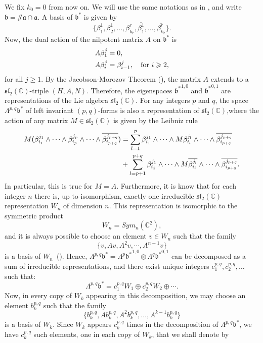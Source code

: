 \documentclass[leqno]{article}
\theoremstyle{definition}
\numberwithin{equation}{section}
\begin{document}
We fix $k_0 = 0$ from now on. We will use the same notations as in \cite{AABRW}, and write $\mathfrak{b} = \mathcal{J}\mathfrak{a} \cap \mathfrak{a}$. A basis of $\mathfrak{b}^*$ is given by
\[
\{
\beta_1^1, \beta_2^1, \dots, \beta_{k_r}^r, \overline{\beta_1^1}, \dots, \overline{\beta_{k_r}^r}
\}.
\]
Now, the dual action of the nilpotent matrix $A$ on $\mathfrak{b}^*$ is 
\[
\aligned
A\beta_1^j &= 0, \\
A\beta_i^j &= \beta_{i-1}^j, \quad \text{for} \ i \geqslant 2,
\endaligned
\]
for all $j \geqslant 1$.
By the Jacobson-Morozov Theorem (\cite{Knapp}), the matrix $A$ extends to a $\mathfrak{sl}_2(\mathbb{C})$-triple $(H, A, N)$. Therefore, the eigenspaces ${\mathfrak{b}^*}^{1, 0}$ and ${\mathfrak{b}^*}^{0, 1}$ are representations of the Lie algebra $\mathfrak{sl}_2(\mathbb{C})$. For any integers $p$ and $q$, the space $\Lambda^{p, q} \mathfrak{b}^*$ of left invariant $(p, q)$-forms is also a representation of $\mathfrak{sl}_2(\mathbb{C})$,where the action of any matrix $M \in \mathfrak{sl}_2(\mathbb{C})$ is given by the Leibniz rule
\[
\aligned
M(\beta_{i_1}^{j_1} \wedge \cdots \wedge \beta_{i_p}^{j_p} \wedge \cdots \wedge \overline{\beta_{i_{p+q}}^{j_{p+q}}})
&=
\sum_{l=1}^{p} \beta_{i_1}^{j_1} \wedge \cdots \wedge M\beta_{i_l}^{j_l} \wedge \cdots \wedge \overline{\beta_{i_{p+q}}^{j_{p+q}}} \\
&+
\sum_{l=p+1}^{p+q} \beta_{i_1}^{j_1} \wedge \cdots \wedge M\overline{\beta_{i_l}^{j_l}} \wedge \cdots \wedge \overline{\beta_{i_{p+q}}^{j_{p+q}}}.
\endaligned
\]
In particular, this is true for $M = A$.
Furthermore, it is know that for each integer $n$ there is, up to isomorphism, exactly one irreducible $\mathfrak{sl}_2(\mathbb{C})$ representation $W_n$ of dimension $n$. This representation is isomorphic to the symmetric product
\[
W_n
=
Sym_n(\mathbb{C}^2),
\] 
and it is always possible to choose an element $v \in W_n$ such that the family
\[
\{
v, Av, A^2v, \cdots, A^{n-1}v
\}
\]
is a basis of $W_n$~(\cite{FH}).
Hence, $\Lambda^{p, q}\mathfrak{b}^* = \Lambda^p {\mathfrak{b}^*}^{1, 0} \otimes \Lambda^q {\mathfrak{b}^*}^{0, 1}$ can be decomposed as a sum of irreducible representations, and there exist unique integers $c_1^{p, q}, c_2^{p, q}, \dots$ such that:
\[
\Lambda^{p, q}\mathfrak{b}^*
=
c_1^{p, q} W_1
\oplus
c_2^{p, q} W_2
\oplus 
\cdots.
\]
Now, in every copy of $W_k$ appearing in this decomposition, we may choose an element $b_k^{p, q}$ such that the family
\[
\{
b_k^{p, q}, Ab_k^{p, q}, A^2b_k^{p, q}, \dots, A^{k-1}b_k^{p, q}
\}
\]
is a basis of $W_k$. Since $W_k$ appears $c_k^{p, q}$ times in the decomposition of $\Lambda^{p, q} \mathfrak{b}^*$, we have $c_k^{p, q}$ such elements, one in each copy of $W_k$, that we shall denote by
\end{document}
